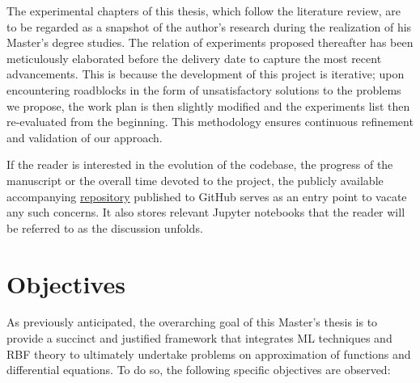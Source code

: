 \documentclass[12pt]{report} %
\begin{document}
The experimental chapters of this thesis, which follow the literature review, are to be regarded as a snapshot of the author's research during the realization of his Master's degree studies. The relation of experiments proposed thereafter has been meticulously elaborated before the delivery date to capture the most recent advancements. This is because the development of this project is iterative; upon encountering roadblocks in the form of unsatisfactory solutions to the problems we propose, the work plan is then slightly modified and the experiments list then re-evaluated from the beginning. This methodology ensures continuous refinement and validation of our approach.

If the reader is interested in the evolution of the codebase, the progress of the manuscript or the overall time devoted to the project, the publicly available accompanying \href{https://github.com/heqro/tfm-experiments}{repository} published to GitHub serves as an entry point to vacate any such concerns. It also stores relevant Jupyter notebooks that the reader will be referred to as the discussion unfolds.



\section{Objectives}

As previously anticipated, the overarching goal of this Master's thesis is to provide a succinct and justified framework that integrates ML techniques and RBF theory to ultimately undertake problems on approximation of functions and differential equations. To do so, the following specific objectives are observed:
\end{document}
